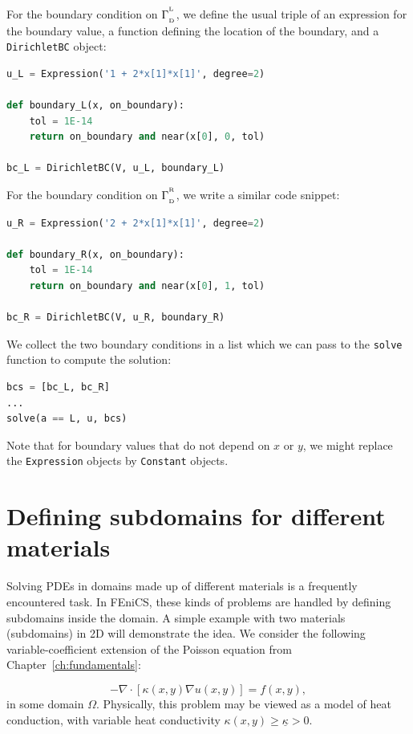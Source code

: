 \documentclass[graybox,envcountchap,sectrefs,final]{svmonodo}
\begin{document}
For the boundary condition on $\GD^{^{\mathrm{L}}}$, we define the
usual triple of an expression for the boundary value, a function
defining the location of the boundary, and a \texttt{DirichletBC} object:

\begin{lstlisting}[language=Python,style=graycolor]
u_L = Expression('1 + 2*x[1]*x[1]', degree=2)

def boundary_L(x, on_boundary):
    tol = 1E-14
    return on_boundary and near(x[0], 0, tol)

bc_L = DirichletBC(V, u_L, boundary_L)
\end{lstlisting}
For the boundary condition on $\GD^{^{\mathrm{R}}}$, we write a
similar code snippet:

\begin{lstlisting}[language=Python,style=graycolor]
u_R = Expression('2 + 2*x[1]*x[1]', degree=2)

def boundary_R(x, on_boundary):
    tol = 1E-14
    return on_boundary and near(x[0], 1, tol)

bc_R = DirichletBC(V, u_R, boundary_R)
\end{lstlisting}
We collect the two boundary conditions in a list which
we can pass to the \texttt{solve} function to compute the solution:

\begin{lstlisting}[language=Python,style=graycolor]
bcs = [bc_L, bc_R]
...
solve(a == L, u, bcs)
\end{lstlisting}

Note that for boundary values that do not depend on $x$ or $y$, we
might replace the \texttt{Expression} objects by \texttt{Constant} objects.


\section{Defining subdomains for different materials}
\label{ftut:possion:2D:2mat:impl}


Solving PDEs in domains made up of different materials is a frequently
encountered task. In FEniCS, these kinds of problems are handled by
defining subdomains inside the domain. A simple example with two
materials (subdomains) in 2D will demonstrate the idea. We consider
the following variable-coefficient extension of the Poisson equation
from Chapter~\ref{ch:fundamentals}:

\begin{equation} \label{ch:poisson0:2D:2mat:varcoeff2}
  -\nabla \cdot \left\lbrack \kappa(x,y)\nabla u(x,y)\right\rbrack =
  f(x, y),
\end{equation}
in some domain $\Omega$.
Physically, this problem may be viewed as a model of heat conduction,
with variable heat conductivity $\kappa(x, y) \geq
\underline{\kappa} > 0$.
\end{document}
